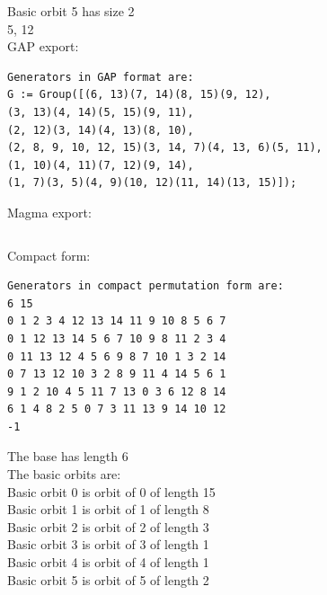 Basic orbit 5 has size 2\\
5, 12\\
\bigskip
GAP export: \\
\begin{verbatim}
Generators in GAP format are:
G := Group([(6, 13)(7, 14)(8, 15)(9, 12), 
(3, 13)(4, 14)(5, 15)(9, 11), 
(2, 12)(3, 14)(4, 13)(8, 10), 
(2, 8, 9, 10, 12, 15)(3, 14, 7)(4, 13, 6)(5, 11), 
(1, 10)(4, 11)(7, 12)(9, 14), 
(1, 7)(3, 5)(4, 9)(10, 12)(11, 14)(13, 15)]);
\end{verbatim}
Magma export: \\
\begin{verbatim}
\end{verbatim}
Compact form: \\
\begin{verbatim}
Generators in compact permutation form are:
6 15
0 1 2 3 4 12 13 14 11 9 10 8 5 6 7 
0 1 12 13 14 5 6 7 10 9 8 11 2 3 4 
0 11 13 12 4 5 6 9 8 7 10 1 3 2 14 
0 7 13 12 10 3 2 8 9 11 4 14 5 6 1 
9 1 2 10 4 5 11 7 13 0 3 6 12 8 14 
6 1 4 8 2 5 0 7 3 11 13 9 14 10 12 
-1
\end{verbatim}
The base has length 6\\
The basic orbits are: \\
Basic orbit 0 is orbit of 0 of length 15\\
Basic orbit 1 is orbit of 1 of length 8\\
Basic orbit 2 is orbit of 2 of length 3\\
Basic orbit 3 is orbit of 3 of length 1\\
Basic orbit 4 is orbit of 4 of length 1\\
Basic orbit 5 is orbit of 5 of length 2\\
